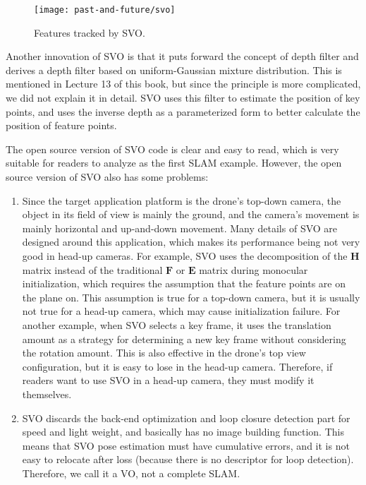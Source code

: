 \begin{figure}[H]
	\centering
	\texttt{[image: past-and-future/svo]}
	\caption{Features tracked by SVO.}
	\label{fig:svo}
\end{figure}

Another innovation of SVO is that it puts forward the concept of depth filter and derives a depth filter based on uniform-Gaussian mixture distribution. This is mentioned in Lecture 13 of this book, but since the principle is more complicated, we did not explain it in detail. SVO uses this filter to estimate the position of key points, and uses the inverse depth as a parameterized form to better calculate the position of feature points.

The open source version of SVO code is clear and easy to read, which is very suitable for readers to analyze as the first SLAM example. However, the open source version of SVO also has some problems:
\begin{enumerate}
	\item Since the target application platform is the drone's top-down camera, the object in its field of view is mainly the ground, and the camera's movement is mainly horizontal and up-and-down movement. Many details of SVO are designed around this application, which makes its performance being not very good in head-up cameras. For example, SVO uses the decomposition of the $\bm{H}$ matrix instead of the traditional $\bm{F}$ or $\bm{E}$ matrix during monocular initialization, which requires the assumption that the feature points are on the plane on. This assumption is true for a top-down camera, but it is usually not true for a head-up camera, which may cause initialization failure. For another example, when SVO selects a key frame, it uses the translation amount as a strategy for determining a new key frame without considering the rotation amount. This is also effective in the drone's top view configuration, but it is easy to lose in the head-up camera. Therefore, if readers want to use SVO in a head-up camera, they must modify it themselves.
	\item SVO discards the back-end optimization and loop closure detection part for speed and light weight, and basically has no image building function. This means that SVO pose estimation must have cumulative errors, and it is not easy to relocate after loss (because there is no descriptor for loop detection). Therefore, we call it a VO, not a complete SLAM.
\end{enumerate}

